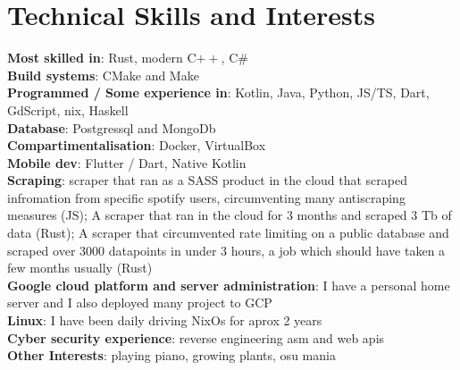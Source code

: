 \documentclass[a4paper,11pt]{article}
\begin{document}
\section{\textbf{Technical Skills and Interests}}
\begin{itemize}[leftmargin=0.05in, label={}]
    \small{\item{
          \textbf{Most skilled in}{: Rust, modern C$++$, C\#} \\
          \textbf{Build systems}{: CMake and Make} \\
          \textbf{Programmed / Some experience in}{: Kotlin, Java, Python, JS/TS, Dart, GdScript, nix, Haskell} \\
          \textbf{Database}{: Postgressql and MongoDb} \\
          \textbf{Compartimentalisation}{: Docker, VirtualBox} \\
          \textbf{Mobile dev}{: Flutter / Dart, Native Kotlin} \\
          \textbf{Scraping}{:  scraper that ran as a SASS product in the cloud that scraped infromation from specific spotify users, circumventing many antiscraping measures (JS); A scraper that ran in the cloud for 3 months and scraped 3 Tb of data (Rust); A scraper that circumvented rate limiting on a public database and scraped over 3000 datapoints in under 3 hours, a job which should have taken a few months usually (Rust) } \\
          \textbf{Google cloud platform and server administration}{: I have a personal home server and I also deployed many project to GCP } \\
          \textbf{Linux}{: I have been daily driving NixOs for aprox 2 years} \\
          \textbf{Cyber security experience}{: reverse engineering asm and web apis} \\
          \textbf{Other Interests}{: playing piano, growing plants, osu mania} \\
          }}
\end{itemize}
\vspace{-16pt}
\end{document}

